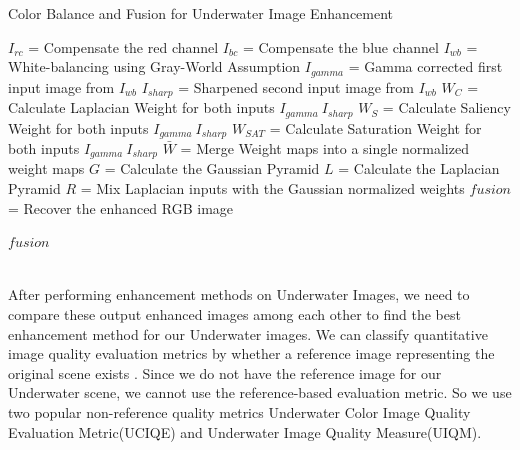 \documentclass[a4paper,11pt,oneside]{article}
\begin{document}
  \begin{algorithm}
	\caption*{Color Balance and Fusion for Underwater Image Enhancement \cite{16}}
	\begin{algorithmic}

    \State $I_{rc}$ = Compensate the red channel
    \State $I_{bc}$ = Compensate the blue channel
    \State $I_{wb}$ = White-balancing using Gray-World Assumption
    \State $I_{gamma}$ = Gamma corrected first input image from $I_{wb}$
    \State $I_{sharp}$ = Sharpened second input image from $I_{wb}$
    \State
    \State $W_C$ = Calculate Laplacian Weight for both inputs $I_{gamma} \: I_{sharp}$
    \State $W_S$ = Calculate Saliency Weight for both inputs $I_{gamma} \: I_{sharp}$
    \State $W_{SAT}$ = Calculate Saturation Weight for both inputs $I_{gamma} \: I_{sharp}$
    \State $\bar W$ = Merge Weight maps into a single normalized weight maps
    \State
    \State $G$ = Calculate the Gaussian Pyramid
    \State $L$ = Calculate the Laplacian Pyramid
    \State
    \State $R$ = Mix Laplacian inputs with the Gaussian normalized weights
    \State
    \State $fusion$ = Recover the enhanced RGB image
    
    \Return $fusion$
\EndProcedure

\end{algorithmic}
\end{algorithm}
\\
After performing enhancement methods on Underwater Images, we need to compare these output enhanced images among each other to find the best enhancement method for our Underwater images. We can classify quantitative image quality evaluation metrics by whether a reference image representing the original scene exists \cite{18}. Since we do not have the reference image for our Underwater scene, we cannot use the reference-based evaluation metric. So we use two popular non-reference quality metrics Underwater Color Image Quality Evaluation Metric(UCIQE) and Underwater Image Quality Measure(UIQM).
\end{document}
